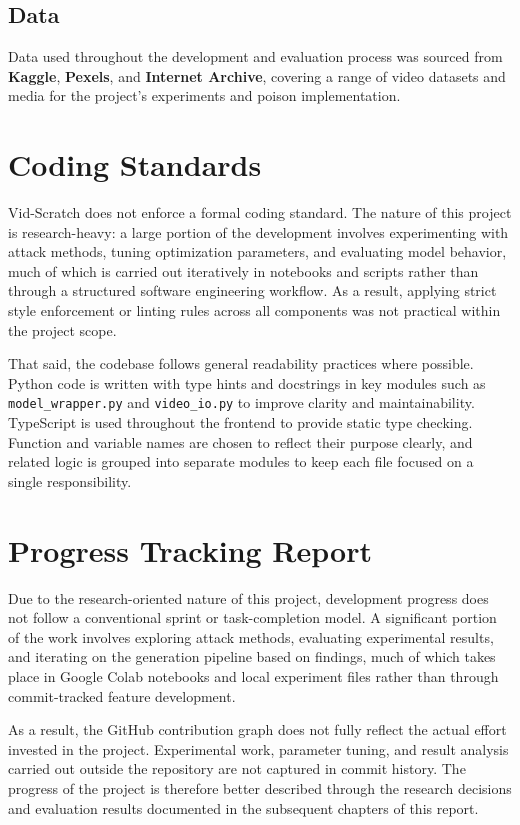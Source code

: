 \subsection{Data}
\label{subsection:data}

Data used throughout the development and evaluation process
was sourced from \textbf{Kaggle}, \textbf{Pexels}, and
\textbf{Internet Archive}, covering a range of video
datasets and media for the project's
experiments and poison implementation.

\section{Coding Standards}
\label{section:coding-standards}

Vid-Scratch does not enforce a formal coding standard.
The nature of this project is research-heavy: a large
portion of the development involves experimenting with
attack methods, tuning optimization parameters, and
evaluating model behavior, much of which is carried out
iteratively in notebooks and scripts rather than through
a structured software engineering workflow. As a result,
applying strict style enforcement or linting rules
across all components was not practical within the
project scope.

That said, the codebase follows general readability
practices where possible. Python code is written with
type hints and docstrings in key modules such as
\texttt{model\_wrapper.py} and \texttt{video\_io.py}
to improve clarity and maintainability. TypeScript is
used throughout the frontend to provide static type
checking. Function and variable names are chosen to
reflect their purpose clearly, and related logic is
grouped into separate modules to keep each file focused
on a single responsibility.

\section{Progress Tracking Report}
\label{section:progress-tracking-report}

Due to the research-oriented nature of this project,
development progress does not follow a conventional
sprint or task-completion model. A significant portion
of the work involves exploring attack methods,
evaluating experimental results, and iterating on the
generation pipeline based on findings, much of which
takes place in Google Colab notebooks and local
experiment files rather than through commit-tracked
feature development.

As a result, the GitHub contribution graph does not
fully reflect the actual effort invested in the project.
Experimental work, parameter tuning, and result
analysis carried out outside the repository are not
captured in commit history. The progress of the project
is therefore better described through the research
decisions and evaluation results documented in the
subsequent chapters of this report.